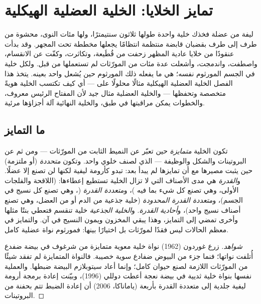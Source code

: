 \chapter{تمايز الخلايا: الخلية العضلية الهيكلية}\label{ch:b2:cell-differentiation}

ليفة من عضلة فخذك خلية واحدة طولها ثلاثون
سنتيمترًا، ولها مئات النوى، محشوة من طرف إلى طرف
بقضبان قابضة منتظمة انتظامًا يجعلها مخططة تحت
المجهر. وقد بدأت عنقودًا من خلايا عادية المظهر
زحفت من قُطَيعة، وتكاثرت، وكفّت عن الانقسام، واصطفت،
واندمجت، وأشعلت عدة مئات من المورّثات لم تستعملها
من قبل. ولكل خلية في الجسم المورثوم نفسه؛ 
هي ما يفعله ذلك المورثوم حين يُشعل  واحد
بعينه. يتخذ هذا الفصل الخلية العضلية الهيكلية مثالًا
محلولًا على \emph{} --- أي كيف تكتسب الخلية
هويةً متخصصة وتحفظها --- والخلية العضلية مثال جيد
لأن المفتاح الرئيس معروف، والخطوات يمكن مراقبتها في
طبق، والخلية النهائية آلة أجزاؤها مرئية.

\section{ما التمايز}

\begin{definition}\label{def:b2:cell-differentiation:differentiation}
تكون الخلية \emph{متمايزة} حين تعبّر عن النميط الثابت
من المورّثات --- ومن ثم عن البروتينات والشكل والوظيفة --- الذي
لصنف خلوي واحد. وتكون \emph{متحددة} (أو ملتزمة) حين يثبت مصيرها
مع أن تمايزها لم يبدأ بعد: 
تبدو كأرومة ليفية لكنها لن تصنع إلا عضلًا. و\emph{القدرة}
هي مدى الأصناف التي لا تزال الخلية تستطيع إعطاءها:
\emph{} (اللاقحة والفلجات الأولى، وهي تصنع كل شيء بما فيه
)، و\emph{متعددة القدرة} (، وهي تصنع
كل نسيج في الجسم)، و\emph{متعددة القدرة المحدودة} (خلية جذعية
من الدم أو من العضل، وهي تصنع أصناف نسيج واحد)،
و\emph{أحادية القدرة}. و\emph{الخلية الجذعية} خلية تنقسم فتعطي
بنتًا مثلها وأخرى تمضي إلى التمايز،
وهذا يبقي المخزون ويمون النسيج في آن. والتمايز
في معظم الحالات ليس فقدًا لمورّثات بل اختيارًا بينها: فمورثوم
نواة عضلية كامل.
\end{definition}
\begin{proof}[شواهد]
زرع غوردون (1962) نواة خلية معوية متمايزة من
شرغوف في بيضة ضفدع أُتلفت نواتها؛
فنما جزء من البيوض ضفادع سوية
خصيبة. فالنواة المتمايزة لم تفقد شيئًا من
المورّثات اللازمة لصنع حيوان كامل؛ وإنما أعاد سيتوبلازم البيضة
ضبطها. والعملية نفسها بنواة خلية ثديية في بيضة نعجة
أعطت دوللي (1996)، وبيّنت إعادة برمجة أرومة ليفية جلدية إلى
 متعددة القدرة بأربعة  (ياماناكا،
2006) أن إعادة الضبط تتم بحفنة من البروتينات.
\end{proof}

